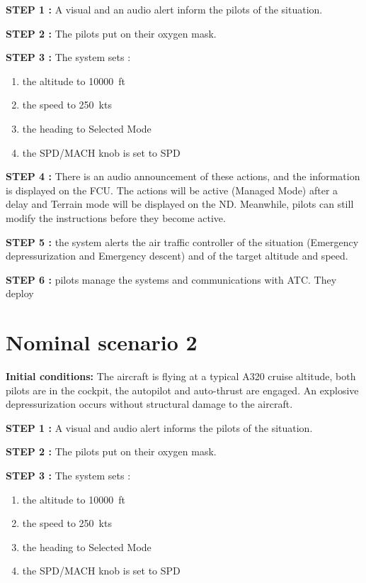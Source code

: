 \documentclass[12pt,oneside]{scrreprt}
\begin{document}
\textbf{STEP 1 :} A visual and an audio alert inform the pilots of the situation. 

\textbf{STEP 2 :} The pilots put on their oxygen mask.

\textbf{STEP 3 :}  The system sets :
\begin{enumerate}
\item the altitude to \SI{10000}{ft}  
\item the speed to \SI{250}{kts} 
\item the heading to Selected Mode
\item  the SPD/MACH knob is set to SPD
\end{enumerate}

\textbf{STEP 4 :} There is an audio announcement of these actions,
and the information is displayed on the FCU. 
The actions will be active (Managed Mode) after a delay and Terrain mode will be displayed on the ND. Meanwhile, pilots can still modify the instructions before they become  active.

\textbf{STEP 5 :} the system alerts the air traffic controller of the situation (Emergency depressurization and Emergency descent) and of the target altitude and speed.

\textbf{STEP 6 :} pilots manage the systems and communications with ATC. They deploy

\section{Nominal scenario 2}

\textbf{Initial conditions:} The aircraft is flying at a typical A320 cruise altitude, both pilots are in the cockpit, the autopilot and auto-thrust are engaged. An explosive depressurization occurs without structural damage to the aircraft.

\textbf{STEP 1 :} A visual and audio alert informs the pilots of the situation.

\textbf{STEP 2 :} The pilots put on their oxygen mask.

\textbf{STEP 3 :} The system sets :
\begin{enumerate}
\item the altitude to \SI{10000}{ft}  
\item the speed to \SI{250}{kts} 
\item the heading to Selected Mode
\item the SPD/MACH knob is set to SPD
\end{enumerate}
\end{document}
